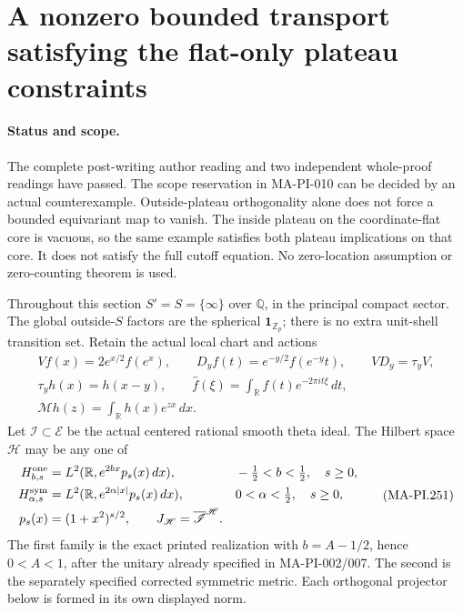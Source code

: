 \section{A nonzero bounded transport satisfying the flat-only plateau constraints}
\label{sec:outside-only-cutoff-counterexample}

\paragraph{Status and scope.}
The complete post-writing author reading and two independent
whole-proof readings have passed.
The scope reservation in MA-PI-010 can be decided by an actual
counterexample.  Outside-plateau orthogonality alone does not
force a bounded equivariant map to vanish.  The inside plateau
on the coordinate-flat core is vacuous, so the same example
satisfies both plateau implications on that core.  It does
not satisfy the full cutoff equation.  No zero-location
assumption or zero-counting theorem is used.

Throughout this section \(S'=S=\{\infty\}\) over
\(\mathbb Q\), in the principal compact sector.  The global
outside-\(S\) factors are the spherical
\(\mathbf1_{\mathbb Z_p}\); there is no extra unit-shell
transition set.  Retain the actual local chart and actions
\[
 \begin{gathered}
 Vf(x)=2e^{x/2}f(e^x),\qquad
 D_yf(t)=e^{-y/2}f(e^{-y}t),\qquad VD_y=\tau_yV,\\
 \tau_yh(x)=h(x-y),\qquad
 \widehat f(\xi)=\int_{\mathbb R}f(t)e^{-2\pi it\xi}\,dt,\\
 \mathcal Mh(z)=\int_{\mathbb R}h(x)e^{zx}\,dx.
 \end{gathered}
 \tag{MA-PI.250}
\]
Let \(\mathscr I\subset\mathcal E\) be the actual centered
rational smooth theta ideal.  The Hilbert space \(\mathscr H\)
may be any one of
\[
 \begin{aligned}
 H^{\rm one}_{b,s}
   &=L^2(\mathbb R,e^{2bx}p_s(x)\,dx),
     &&-\tfrac12<b<\tfrac12,\quad s\ge0,\\
 H^{\rm sym}_{\alpha,s}
   &=L^2(\mathbb R,e^{2\alpha|x|}p_s(x)\,dx),
     &&0<\alpha<\tfrac12,\quad s\ge0,\\
 p_s(x)&=(1+x^2)^{s/2},\qquad
 J_{\mathscr H}=\overline{\mathscr I}^{\mathscr H}.
 \end{aligned}
 \tag{MA-PI.251}
\]
The first family is the exact printed realization with
\(b=A-1/2\), hence \(0<A<1\), after the unitary already
specified in MA-PI-002/007.  The second is the separately
specified corrected symmetric metric.  Each orthogonal
projector below is formed in its own displayed norm.


